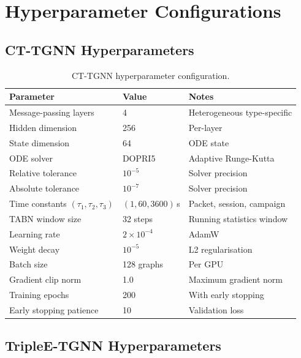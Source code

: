 \section{Hyperparameter Configurations}
\label{app:hyperparams}

\subsection{CT-TGNN Hyperparameters}
\label{app:hp_cttgnn}

\begin{table}[htbp]
\centering
\caption{CT-TGNN hyperparameter configuration.}
\label{tab:hp_cttgnn}
\begin{tabular}{lll}
\toprule
Parameter & Value & Notes \\
\midrule
Message-passing layers     & 4     & Heterogeneous type-specific \\
Hidden dimension           & 256   & Per-layer \\
State dimension            & 64    & ODE state \\
ODE solver                 & DOPRI5 & Adaptive Runge-Kutta \\
Relative tolerance         & $10^{-5}$ & Solver precision \\
Absolute tolerance         & $10^{-7}$ & Solver precision \\
Time constants $(\tau_1,\tau_2,\tau_3)$ & $(1,60,3600)$\,s & Packet, session, campaign \\
TABN window size           & 32 steps & Running statistics window \\
Learning rate              & $2\times10^{-4}$ & AdamW \\
Weight decay               & $10^{-5}$ & L2 regularisation \\
Batch size                 & 128 graphs & Per GPU \\
Gradient clip norm         & 1.0   & Maximum gradient norm \\
Training epochs            & 200   & With early stopping \\
Early stopping patience    & 10    & Validation loss \\
\bottomrule
\end{tabular}
\end{table}


\subsection{TripleE-TGNN Hyperparameters}
\label{app:hp_triplee}

